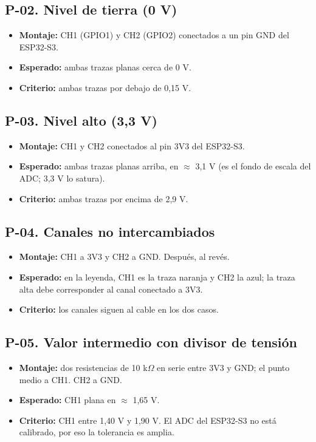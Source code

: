 \documentclass[12pt,a4paper]{article}
\begin{document}
\subsection*{P-02. Nivel de tierra (0 V)}
\begin{itemize}
  \item \textbf{Montaje:} CH1 (GPIO1) y CH2 (GPIO2) conectados a un pin GND del ESP32-S3.
  \item \textbf{Esperado:} ambas trazas planas cerca de 0 V.
  \item \textbf{Criterio:} ambas trazas por debajo de 0{,}15 V.
\end{itemize}

\subsection*{P-03. Nivel alto (3{,}3 V)}
\begin{itemize}
  \item \textbf{Montaje:} CH1 y CH2 conectados al pin 3V3 del ESP32-S3.
  \item \textbf{Esperado:} ambas trazas planas arriba, en $\approx$ 3{,}1 V (es el fondo de escala del ADC; 3{,}3 V lo satura).
  \item \textbf{Criterio:} ambas trazas por encima de 2{,}9 V.
\end{itemize}

\subsection*{P-04. Canales no intercambiados}
\begin{itemize}
  \item \textbf{Montaje:} CH1 a 3V3 y CH2 a GND. Después, al revés.
  \item \textbf{Esperado:} en la leyenda, CH1 es la traza naranja y CH2 la azul; la traza alta debe corresponder al canal conectado a 3V3.
  \item \textbf{Criterio:} los canales siguen al cable en los dos casos.
\end{itemize}

\subsection*{P-05. Valor intermedio con divisor de tensión}
\begin{itemize}
  \item \textbf{Montaje:} dos resistencias de 10 k$\Omega$ en serie entre 3V3 y GND; el punto medio a CH1. CH2 a GND.
  \item \textbf{Esperado:} CH1 plana en $\approx$ 1{,}65 V.
  \item \textbf{Criterio:} CH1 entre 1{,}40 V y 1{,}90 V. El ADC del ESP32-S3 no está calibrado, por eso la tolerancia es amplia.
\end{itemize}
\end{document}
